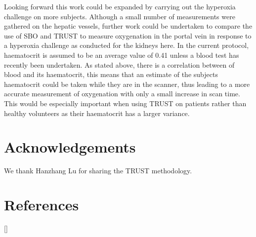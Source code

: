 Looking forward this work could be expanded by carrying out the hyperoxia challenge on more subjects. Although a small number of measurements were gathered on the hepatic vessels, further work could be undertaken to compare the use of \ac{SBO} and \ac{TRUST} to measure oxygenation in the portal vein in response to a hyperoxia challenge as conducted for the kidneys here. In the current protocol, haematocrit is assumed to be an average value of 0.41 unless a blood test has recently been undertaken. As stated above, there is a correlation between \tone of blood and its haematocrit, this means that an estimate of the subjects haematocrit could be taken while they are in the scanner, thus leading to a more accurate measurement of oxygenation with only a small increase in scan time. This would be especially important when using \ac{TRUST} on patients rather than healthy volunteers as their haematocrit has a larger variance. 

\section{Acknowledgements}

We thank Hanzhang Lu for sharing the TRUST methodology.

\newpage
\section{References}
[\refname]{}
\printbibliography